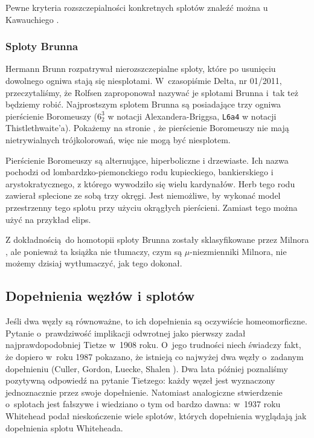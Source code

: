 Pewne kryteria rozszczepialności konkretnych splotów znaleźć można u Kawauchiego \cite[s. 36-38]{kawauchi1996}.

\subsubsection{Sploty Brunna}
%
Hermann Brunn \cite{brunn1892} rozpatrywał nierozszczepialne sploty, które po usunięciu dowolnego ogniwa stają się niesplotami.
%
W~czasopiśmie Delta, nr 01/2011, przeczytaliśmy, że Rolfsen zaproponował nazywać je splotami Brunna i~tak też będziemy robić.
Najprostszym splotem Brunna są posiadające trzy ogniwa pierścienie Boromeuszy ($6_2^3$ w notacji Alexandera-Briggsa, \texttt{L6a4} w notacji Thistlethwaite'a).
%
Pokażemy na stronie \pageref{boromean_not_splittable}, że pierścienie Boromeuszy nie mają nietrywialnych trójkolorowań, więc nie mogą być niesplotem.

Pierścienie Boromeuszy są alternujące, hiperboliczne i drzewiaste.
%
%
%
Ich nazwa pochodzi od lombardzko-piemonckiego rodu kupieckiego, bankierskiego i arystokratycznego, z którego wywodziło się wielu kardynałów.
Herb tego rodu zawierał splecione ze sobą trzy okręgi.
Jest niemożliwe, by wykonać model przestrzenny tego splotu przy użyciu okrągłych pierścieni.
Zamiast tego można użyć na przykład elips.

Z dokładnością do homotopii sploty Brunna zostały sklasyfikowane przez Milnora \cite{milnor1954}, ale ponieważ ta książka nie tłumaczy, czym są $\mu$-niezmienniki Milnora, nie możemy dzisiaj wytłumaczyć, jak tego dokonał.
%
%

\subsection{Dopełnienia węzłów i splotów}
Jeśli dwa węzły są równoważne, to ich dopełnienia są oczywiście homeomorficzne.
Pytanie o~prawdziwość implikacji odwrotnej jako pierwszy zadał najprawdopodobniej Tietze \cite{tietze1908} w~1908 roku.
%
O~jego trudności niech świadczy fakt, że dopiero w~roku 1987 pokazano, że istnieją co najwyżej dwa węzły o~zadanym dopełnieniu (Culler, Gordon, Luecke, Shalen \cite{culler1987}).
%
%
%
%
Dwa lata później poznaliśmy pozytywną odpowiedź na pytanie Tietzego: każdy węzeł jest wyznaczony jednoznacznie przez swoje dopełnienie.
Natomiast analogiczne stwierdzenie o~splotach jest fałszywe i wiedziano o tym od bardzo dawna: w~1937 roku Whitehead \cite{whitehead1937} podał nieskończenie wiele splotów, których dopełnienia wyglądają jak dopełnienia splotu Whiteheada.

